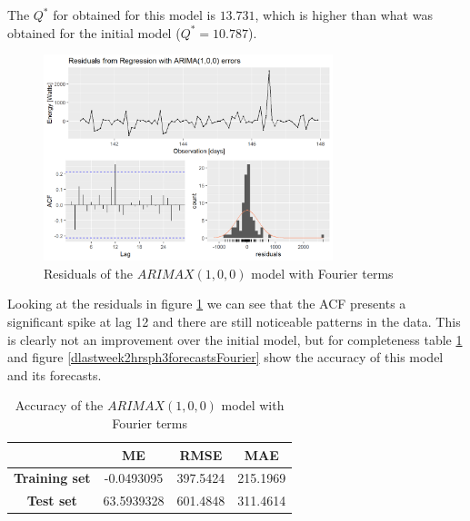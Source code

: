 \documentclass[12pt,a4paper,titlepage]{report}
\begin{document}
The $ Q^* $ for obtained for this model is $ 13.731 $, which is higher than what was obtained for the initial model ($ Q^* = 10.787 $).

\begin{figure}[h]
    \centering
    \includegraphics[width=0.75\textwidth]{dlastweek2hrsph3residualsFourier}
    \caption{Residuals of the $ ARIMAX(1, 0, 0) $ model with Fourier terms}
    \label{dlastweek2hrsph3residualsFourier}
\end{figure}

Looking at the residuals in figure \ref{dlastweek2hrsph3residualsFourier} we can see that the ACF presents a significant spike at lag 12 and there are still noticeable patterns in the data. This is clearly not an improvement over the initial model, but for completeness table \ref{accuracyofFouriermodel} and figure \ref{dlastweek2hrsph3forecastsFourier} show the accuracy of this model and its forecasts.

\begin{table}[h]
    \begin{tabular}{|c|c|c|c|}
        \hline
        & \textbf{ME} & \textbf{RMSE} & \textbf{MAE}\\
        \hline
        \textbf{Training set} & -0.0493095 & 397.5424 & 215.1969 \\
        \hline
        \textbf{Test set} & 63.5939328 & 601.4848 & 311.4614 \\
        \hline
    \end{tabular}
\centering
\caption{Accuracy of the $ ARIMAX(1, 0, 0) $ model with Fourier terms}
\label{accuracyofFouriermodel}
\end{table}
\end{document}
